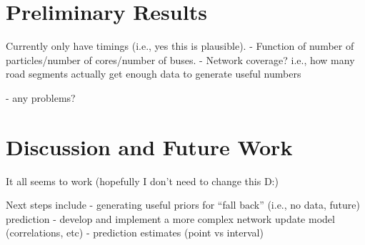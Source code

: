 \documentclass[times, doublespace]{anzsauth}
\begin{document}
\section{Preliminary Results}
\label{sec:results}

Currently only have timings (i.e., yes this is plausible).
- Function of number of particles/number of cores/number of buses.
- Network coverage? i.e., how many road segments actually get enough data
to generate useful numbers

- any problems?


\section{Discussion and Future Work}
\label{sec:discussion}

It all seems to work (hopefully I don't need to change this D:)

Next steps include
- generating useful priors for ``fall back'' (i.e., no data, future) prediction
- develop and implement a more complex network update model (correlations, etc)
- prediction estimates (point vs interval)

\cite{Hans_2015}




\end{document}
